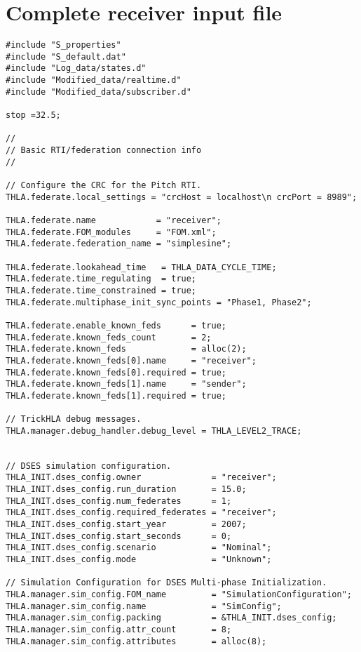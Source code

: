 \clearpage

\section{Complete receiver input file}\label{sec:complete-receiver-input}

\begin{lstlisting}[caption={{\tt SIM\_simplesine\_hla\_receiveInt} input file},label={list:complete-receiver-input}]
#include "S_properties"
#include "S_default.dat"
#include "Log_data/states.d"
#include "Modified_data/realtime.d"
#include "Modified_data/subscriber.d"

stop =32.5; 

//
// Basic RTI/federation connection info
//

// Configure the CRC for the Pitch RTI.
THLA.federate.local_settings = "crcHost = localhost\n crcPort = 8989";

THLA.federate.name            = "receiver"; 
THLA.federate.FOM_modules     = "FOM.xml"; 
THLA.federate.federation_name = "simplesine"; 

THLA.federate.lookahead_time   = THLA_DATA_CYCLE_TIME;
THLA.federate.time_regulating  = true; 
THLA.federate.time_constrained = true; 
THLA.federate.multiphase_init_sync_points = "Phase1, Phase2";

THLA.federate.enable_known_feds      = true; 
THLA.federate.known_feds_count       = 2; 
THLA.federate.known_feds             = alloc(2); 
THLA.federate.known_feds[0].name     = "receiver"; 
THLA.federate.known_feds[0].required = true; 
THLA.federate.known_feds[1].name     = "sender"; 
THLA.federate.known_feds[1].required = true; 

// TrickHLA debug messages.
THLA.manager.debug_handler.debug_level = THLA_LEVEL2_TRACE;


// DSES simulation configuration.
THLA_INIT.dses_config.owner              = "receiver";
THLA_INIT.dses_config.run_duration       = 15.0;
THLA_INIT.dses_config.num_federates      = 1;
THLA_INIT.dses_config.required_federates = "receiver";
THLA_INIT.dses_config.start_year         = 2007;
THLA_INIT.dses_config.start_seconds      = 0;
THLA_INIT.dses_config.scenario           = "Nominal";
THLA_INIT.dses_config.mode               = "Unknown";

// Simulation Configuration for DSES Multi-phase Initialization.
THLA.manager.sim_config.FOM_name         = "SimulationConfiguration";
THLA.manager.sim_config.name             = "SimConfig";
THLA.manager.sim_config.packing          = &THLA_INIT.dses_config;
THLA.manager.sim_config.attr_count       = 8;
THLA.manager.sim_config.attributes       = alloc(8);


\end{lstlisting}
